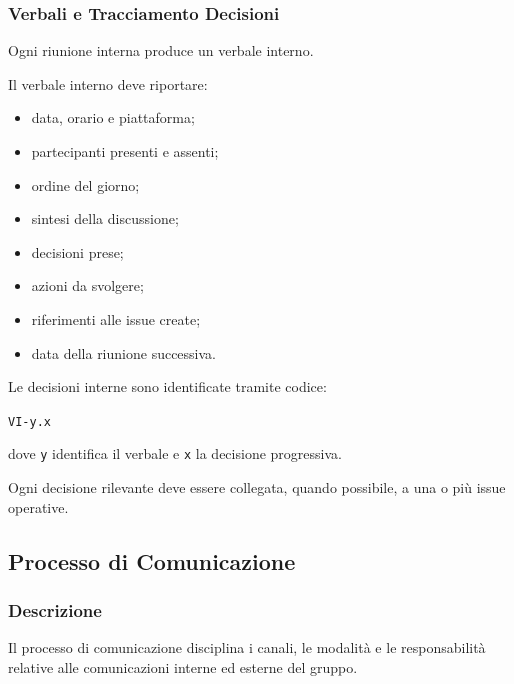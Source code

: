
\subsubsection{Verbali e Tracciamento Decisioni}

Ogni riunione interna produce un verbale interno.

Il verbale interno deve riportare:

\begin{itemize}
    \item data, orario e piattaforma;
    \item partecipanti presenti e assenti;
    \item ordine del giorno;
    \item sintesi della discussione;
    \item decisioni prese;
    \item azioni da svolgere;
    \item riferimenti alle issue create;
    \item data della riunione successiva.
\end{itemize}

Le decisioni interne sono identificate tramite codice:

\begin{center}
    \texttt{VI-y.x}
\end{center}

dove \texttt{y} identifica il verbale e \texttt{x} la decisione progressiva.

Ogni decisione rilevante deve essere collegata, quando possibile, a una o più
issue operative.


\subsection{Processo di Comunicazione}
\label{sec:comunicazione}

\subsubsection{Descrizione}

Il processo di comunicazione disciplina i canali, le modalità e le responsabilità
relative alle comunicazioni interne ed esterne del gruppo.

